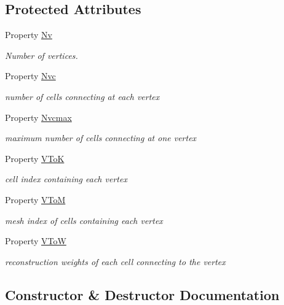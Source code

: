 \subsection*{Protected Attributes}
\begin{DoxyCompactItemize}
\item 
Property \hyperlink{class_ndg_vert_limiter_ab29fe1699e4b37765869b5aabd253416}{Nv}
\begin{DoxyCompactList}\small\item\em Number of vertices. \end{DoxyCompactList}\item 
Property \hyperlink{class_ndg_vert_limiter_a57d41a4b1bcb633d7027e520a4369ca1}{Nvc}
\begin{DoxyCompactList}\small\item\em number of cells connecting at each vertex \end{DoxyCompactList}\item 
Property \hyperlink{class_ndg_vert_limiter_a7612024d183c8008e129b53182c5f2d7}{Nvcmax}
\begin{DoxyCompactList}\small\item\em maximum number of cells connecting at one vertex \end{DoxyCompactList}\item 
Property \hyperlink{class_ndg_vert_limiter_a6e7c806e168430bdc34042a6447069a6}{V\+ToK}
\begin{DoxyCompactList}\small\item\em cell index containing each vertex \end{DoxyCompactList}\item 
Property \hyperlink{class_ndg_vert_limiter_ab6a73029baf74d7a4ccce2747bc6c958}{V\+ToM}
\begin{DoxyCompactList}\small\item\em mesh index of cells containing each vertex \end{DoxyCompactList}\item 
Property \hyperlink{class_ndg_vert_limiter_a771cef5e7edb7ea0fb5a6634dbe5f4d8}{V\+ToW}
\begin{DoxyCompactList}\small\item\em reconstruction weights of each cell connecting to the vertex \end{DoxyCompactList}\end{DoxyCompactItemize}


\subsection{Constructor \& Destructor Documentation}
\mbox{\label{class_ndg_vert_limiter_af301f96d7f8b872f3185b727e8fc3d74}} 

